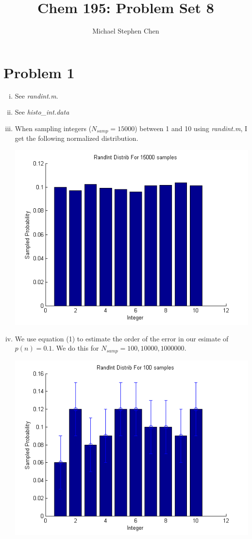 \documentclass{article}
\title{Chem 195: Problem Set 8}
\author{Michael Stephen Chen}
\begin{document}
\maketitle
\pagebreak

\section*{Problem 1}
\begin{enumerate}[i.]
  \item See \textit{randint.m}.
  \item See \textit{histo\_int.data}
  \item When sampling integers ($N_{samp}=15000$) between 1 and 10 using \textit{randint.m}, I get the following normalized distribution.
    \begin{center}
      \includegraphics[scale=0.5]{prob1part3}
    \end{center}
  \item We use equation (1) to estimate the order of the error in our esimate of $p(n) = 0.1$. We do this for $N_{samp}=100, 10000, 1000000$.
    \begin{center}
      \includegraphics[scale=0.5]{prob1part4_1}


\end{center}
\end{enumerate}
\end{document}
